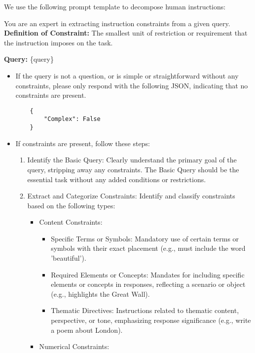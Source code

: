 We use the following prompt template to decompose human instructions:
\begin{tcolorbox}[title = {Prompt Template of Instruction Decomposition}, breakable]
You are an expert in extracting instruction constraints from a given query. \\
\textbf{Definition of Constraint:} The smallest unit of restriction or requirement that the instruction imposes on the task.

\textbf{Query:} \{query\}

\begin{itemize}
    \item If the query is not a question, or is simple or straightforward without any constraints, please only respond with the following JSON, indicating that no constraints are present.
    \begin{verbatim}
    {
        "Complex": False
    }
    \end{verbatim}
    \item If constraints are present, follow these steps:
    \begin{enumerate}
        \item Identify the Basic Query: Clearly understand the primary goal of the query, stripping away any constraints. The Basic Query should be the essential task without any added conditions or restrictions.
        \item Extract and Categorize Constraints: Identify and classify constraints based on the following types:
        \begin{itemize}
            \item Content Constraints:
            \begin{itemize}
                \item Specific Terms or Symbols: Mandatory use of certain terms or symbols with their exact placement (e.g., must include the word 'beautiful').
                \item Required Elements or Concepts: Mandates for including specific elements or concepts in responses, reflecting a scenario or object (e.g., highlights the Great Wall).
                \item Thematic Directives: Instructions related to thematic content, perspective, or tone, emphasizing response significance (e.g., write a poem about London).
            \end{itemize}
            \item Numerical Constraints:
            \begin{itemize}

\end{itemize}
\end{itemize}
\end{enumerate}
\end{itemize}
\end{tcolorbox}
